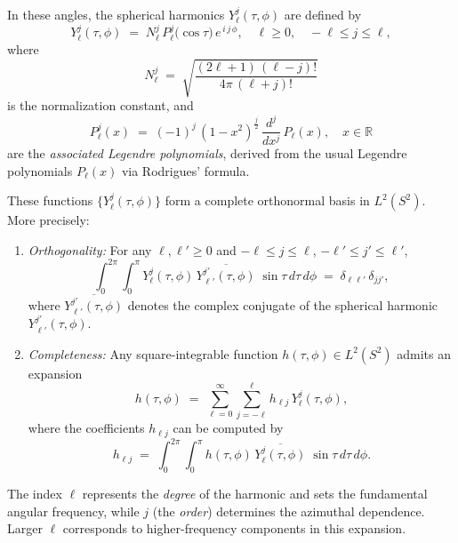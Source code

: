 \documentclass[review,onefignum,onetabnum,onealgnum]{siamart250106}
\numberwithin{theorem}{section}
\begin{document}
In these angles, the spherical harmonics \(Y_{\ell}^j(\tau,\phi)\) are defined by
\begin{equation}\label{YelljDefPolar}
Y_\ell^j(\tau,\phi)
\;=\;
N_\ell^j 
\,P_\ell^j\!\bigl(\cos\tau\bigr)
\,e^{\,i\,j\,\phi},
\quad
\ell\ge0,
\quad
-\ell\le j\le \ell,
\end{equation}
where
\begin{equation}\label{NelljDef}
N_\ell^j
\;=\;
\sqrt{\frac{(2\ell+1)\,(\ell-j)!}{4\pi\,(\ell+j)!}}
\end{equation}
is the normalization constant, and 
\[
P_\ell^j(x)
\;=\;
(-1)^j\,(1-x^2)^{\tfrac{j}{2}}\,
\frac{d^j}{dx^j}\,P_\ell(x), \quad x\in \mathbb{R}
\]
are the \emph{associated Legendre polynomials}, derived from the usual Legendre polynomials \(P_\ell(x)\) via Rodrigues’ formula.

These functions \(\{Y_{\ell}^j(\tau,\phi)\}\) form a complete orthonormal basis in \(L^2(S^2)\).  More precisely:
\begin{enumerate}
\item 
\emph{Orthogonality:} For any \(\ell,\ell'\ge0\) and \(-\ell\le j\le \ell\), \(-\ell'\le j'\le \ell'\),
\begin{equation}
\int_{0}^{2\pi}\!\!\!\int_{0}^{\pi}
Y_{\ell}^j(\tau,\phi)\,\overline{Y_{\ell'}^{j'}(\tau,\phi)}
\;\sin\tau\,d\tau\,d\phi
\;=\;
\delta_{\ell\ell'}\,\delta_{jj'},
\end{equation}
where $\overline{Y_{\ell'}^{j'}(\tau,\phi)}$ denotes the complex conjugate of the spherical harmonic \(Y_{\ell'}^{j'}(\tau,\phi)\).
\item 
\emph{Completeness:} Any square-integrable function \(h(\tau,\phi)\in L^2(S^2)\) admits an expansion
\begin{equation}\label{uxexpansionPolar}
h(\tau,\phi)
\;=\;
\sum_{\ell=0}^\infty 
\sum_{j=-\ell}^\ell 
h_{\ell j}\,
Y_\ell^j(\tau,\phi),
\end{equation}
where the coefficients \(h_{\ell j}\) can be computed by
\begin{equation}\label{cuxexpansionPolar}
h_{\ell j} 
\;=\;
\int_{0}^{2\pi}\!\!\!\int_{0}^{\pi}
h(\tau,\phi)\,\overline{Y_\ell^j(\tau,\phi)}
\;\sin\tau\,d\tau\,d\phi.
\end{equation}
\end{enumerate}


The index \(\ell\) represents the \emph{degree} of the harmonic and sets the fundamental angular frequency, while \(j\) (the \emph{order}) determines the azimuthal dependence.  Larger \(\ell\) corresponds to higher-frequency components in this expansion.
\end{document}
